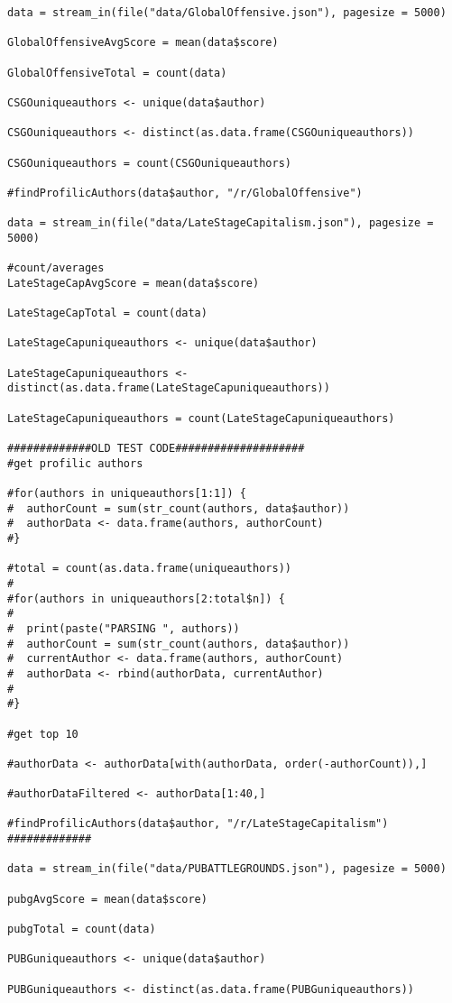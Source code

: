 \begin{lstlisting}
data = stream_in(file("data/GlobalOffensive.json"), pagesize = 5000)

GlobalOffensiveAvgScore = mean(data$score)

GlobalOffensiveTotal = count(data)

CSGOuniqueauthors <- unique(data$author)

CSGOuniqueauthors <- distinct(as.data.frame(CSGOuniqueauthors))

CSGOuniqueauthors = count(CSGOuniqueauthors)

#findProfilicAuthors(data$author, "/r/GlobalOffensive")

data = stream_in(file("data/LateStageCapitalism.json"), pagesize = 5000)

#count/averages
LateStageCapAvgScore = mean(data$score)

LateStageCapTotal = count(data)

LateStageCapuniqueauthors <- unique(data$author)

LateStageCapuniqueauthors <- distinct(as.data.frame(LateStageCapuniqueauthors))

LateStageCapuniqueauthors = count(LateStageCapuniqueauthors)

#############OLD TEST CODE####################
#get profilic authors

#for(authors in uniqueauthors[1:1]) {
#  authorCount = sum(str_count(authors, data$author))
#  authorData <- data.frame(authors, authorCount)
#}

#total = count(as.data.frame(uniqueauthors))
#
#for(authors in uniqueauthors[2:total$n]) {
#  
#  print(paste("PARSING ", authors))
#  authorCount = sum(str_count(authors, data$author))
#  currentAuthor <- data.frame(authors, authorCount)
#  authorData <- rbind(authorData, currentAuthor)
#
#}

#get top 10

#authorData <- authorData[with(authorData, order(-authorCount)),]

#authorDataFiltered <- authorData[1:40,]

#findProfilicAuthors(data$author, "/r/LateStageCapitalism")
#############

data = stream_in(file("data/PUBATTLEGROUNDS.json"), pagesize = 5000)

pubgAvgScore = mean(data$score)

pubgTotal = count(data)

PUBGuniqueauthors <- unique(data$author)

PUBGuniqueauthors <- distinct(as.data.frame(PUBGuniqueauthors))


\end{lstlisting}
